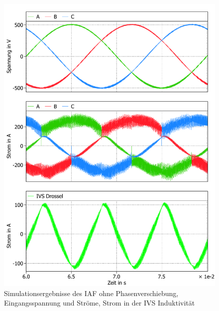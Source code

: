 \begin{figure}
	\centering
	\includegraphics[width=1\linewidth]{content/Grafiken/IAF_AC+L}
	\caption{Simulationsergebnisse des IAF ohne Phasenverschiebung, Eingangsspannung und Ströme, Strom in der IVS Induktivität }
	\label{fig:iafacl}
\end{figure}
